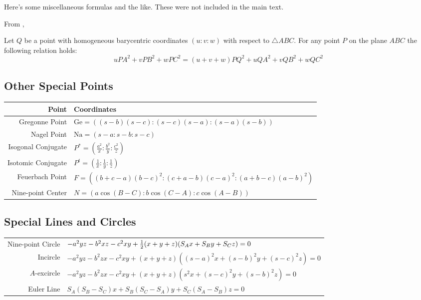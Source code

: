 Here's some miscellaneous formulas and the like.  These were not included in the main text.

From \cite{leibnizthm},
\begin{theorem}
  Let $Q$ be a point with homogeneous barycentric coordinates $(u: v: w)$ with respect to $\triangle ABC$.  For any point $P$ on the plane $ABC$ the following relation holds:
  \[ uPA^2 + vPB^2 + wPC^2 = (u + v + w)PQ^2 + uQA^2 + vQB^2 + wQC^2 \]
\end{theorem}

\subsection{Other Special Points}
\begin{tabular}{r|l}
  Point & Coordinates \\ \hline
  Gregonne Point \cite{wolfram} & $\text{Ge} = ((s-b)(s-c) : (s-c)(s-a) : (s-a)(s-b))$ \\
  Nagel Point \cite{wolfram} & $\text{Na} = (s-a : s-b : s-c)$ \\
  Isogonal Conjugate \cite{infinity} & $P^\ast = \left( \frac{a^2}{x} : \frac{b^2}{y} : \frac{c^2}{z} \right)$ \\
  Isotomic Conjugate \cite{infinity} & $P^t = \left( \frac{1}{x} : \frac{1}{y} : \frac{1}{z} \right)$ \\
  Feuerbach Point \cite{fpoint} & $F = \left((b+c-a)(b-c)^2 : (c+a-b)(c-a)^2 : (a+b-c)(a-b)^2 \right)$ \\
  Nine-point Center & $N = (a\cos(B-C) : b\cos(C-A) : c\cos(A-B))$
\end{tabular}

\subsection{Special Lines and Circles}

\begin{tabular}{rl}
  Nine-point Circle & $-a^2yz-b^2xz-c^2xy+ \frac{1}{2} (x+y+z)(S_Ax+S_By+S_Cz) = 0$ \\
  Incircle & $-a^2yz - b^2zx  - c^2xy + (x+y+z)\left( (s-a)^2x + (s-b)^2y + (s-c)^2z \right) = 0$ \\
  $A$-excircle \cite{book} & $-a^2yz - b^2zx - c^2xy + (x+y+z)\left( s^2 x + (s-c)^2 y + (s-b)^2 z \right) = 0$ \\
  Euler Line \cite{book} & $S_A(S_B-S_C)x + S_B(S_C-S_A)y + S_C(S_A-S_B)z = 0$
\end{tabular}
